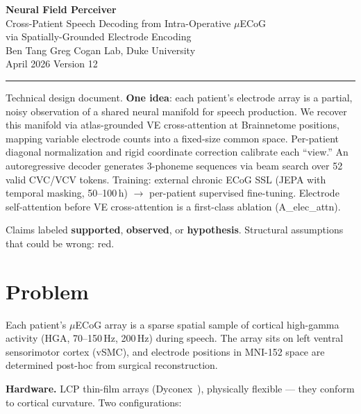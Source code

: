 \documentclass[11pt,letterpaper]{article}
\begin{document}
\begin{center}
{\LARGE\bfseries Neural Field Perceiver}\\[6pt]
{\large Cross-Patient Speech Decoding from Intra-Operative $\mu$ECoG\\via Spatially-Grounded Electrode Encoding}\\[12pt]
{\normalsize Ben Tang \quad\textbar\quad Greg Cogan Lab, Duke University}\\[4pt]
{\normalsize April 2026 \quad\textbar\quad Version 12}
\end{center}

\medskip\noindent\rule{\textwidth}{0.4pt}\medskip

\noindent Technical design document. \textbf{One idea}: each patient's electrode array is a partial, noisy observation of a shared neural manifold for speech production. We recover this manifold via atlas-grounded VE cross-attention at Brainnetome positions, mapping variable electrode counts into a fixed-size common space. Per-patient diagonal normalization and rigid coordinate correction calibrate each ``view.'' An autoregressive decoder generates 3-phoneme sequences via beam search over 52 valid CVC/VCV tokens. Training: external chronic ECoG SSL (JEPA with temporal masking, 50--100\,h) $\to$ per-patient supervised fine-tuning. Electrode self-attention before VE cross-attention is a first-class ablation (A\_elec\_attn).

Claims labeled \textbf{supported}, \textbf{observed}, or \textbf{hypothesis}.
Structural assumptions that could be wrong: \textcolor{BrickRed}{red}.

\tableofcontents
\newpage



\section{Problem}\label{sec:problem}

Each patient's $\mu$ECoG array is a sparse spatial sample of cortical high-gamma activity (HGA, 70--150\,Hz, 200\,Hz) during speech. The array sits on left ventral sensorimotor cortex (vSMC), and electrode positions in MNI-152 space are determined post-hoc from surgical reconstruction.

\textbf{Hardware.} LCP thin-film arrays (Dyconex~\cite{duraivel2023}), physically flexible --- they conform to cortical curvature. Two configurations:
\end{document}
